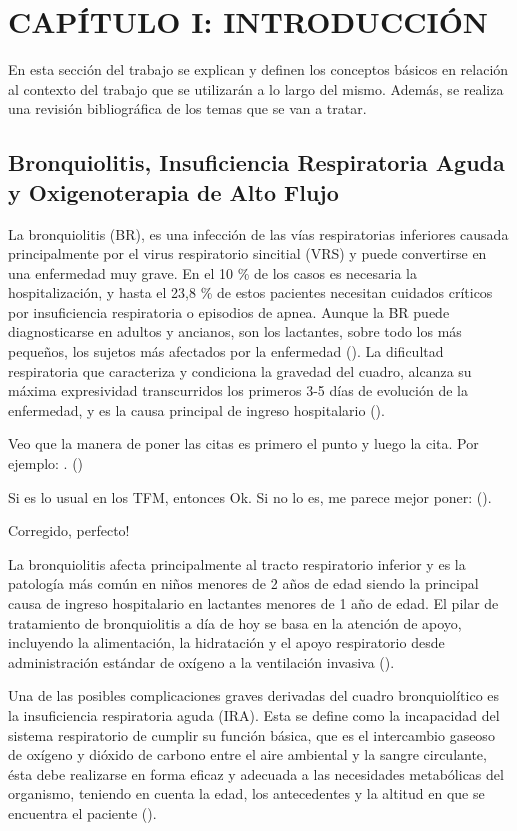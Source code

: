\section{CAPÍTULO I: INTRODUCCIÓN}\label{sec:introduction}

En esta sección del trabajo se explican y definen los conceptos básicos en relación al contexto del trabajo que se utilizarán a lo largo del mismo. Además, se realiza una revisión bibliográfica de los temas que se van a tratar.

\subsection{Bronquiolitis, Insuficiencia Respiratoria Aguda y Oxigenoterapia de Alto Flujo}

La bronquiolitis (BR), es una infección de las vías respiratorias inferiores causada principalmente por el virus respiratorio sincitial (VRS) y puede convertirse en una enfermedad muy grave. En el 10 \% de los casos es necesaria la hospitalización, y hasta el 23,8 \% de estos pacientes necesitan cuidados críticos por insuficiencia respiratoria o episodios de apnea. Aunque la BR puede diagnosticarse en adultos y ancianos, son los lactantes, sobre todo los más pequeños, los sujetos más afectados por la enfermedad (\cite{Fainardi2021}). La dificultad respiratoria que caracteriza y condiciona la gravedad del cuadro, alcanza su máxima expresividad transcurridos los primeros 3-5 días de evolución de la enfermedad, y es la causa principal de ingreso hospitalario (\cite{Patel2003}).

{\color{blue} Veo que la manera de poner las citas es primero el punto y luego la cita. Por ejemplo: . (\cite{Patel2003})}

{\color{blue} Si es lo usual en los TFM, entonces Ok. Si no lo es, me parece mejor poner: (\cite{Patel2003}).}

{\color{green} Corregido, perfecto!}

La bronquiolitis afecta principalmente al tracto respiratorio inferior y es la patología más común en niños menores de 2 años de edad siendo la principal causa de ingreso hospitalario en lactantes menores de 1 año de edad. El pilar de tratamiento de bronquiolitis a día de hoy se basa en la atención de apoyo, incluyendo la alimentación, la hidratación y el apoyo respiratorio desde administración estándar de oxígeno a la ventilación invasiva (\cite{Daverio2019}).

Una de las posibles complicaciones graves derivadas del cuadro bronquiolítico es la insuficiencia respiratoria aguda (IRA). Esta se define como la incapacidad del sistema respiratorio de cumplir su función básica, que es el intercambio gaseoso de oxígeno y dióxido de carbono entre el aire ambiental y la sangre circulante, ésta debe realizarse en forma eficaz y adecuada a las necesidades metabólicas del organismo, teniendo en cuenta la edad, los antecedentes y la altitud en que se encuentra el paciente (\cite{FernandoR2010}). 

